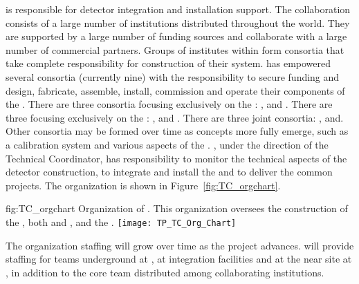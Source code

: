  is responsible for detector integration
and installation support. 
The  collaboration consists of a large number of
institutions distributed throughout the world. They are supported by a
large number of funding sources and collaborate with a large number of
commercial partners. Groups of institutes within  form
consortia that take complete responsibility for construction of their
system.   has empowered several consortia (currently nine)
with the responsibility to secure funding and design, fabricate,
assemble, install, commission and operate their components of the
 . There are three consortia focusing
exclusively on the : ,
\single {} and \single {}. There are three
focusing exclusively on the : 
, \dual {} and \dual {}. There are
three joint consortia: ,  and. Other consortia may
be formed over time as concepts more fully emerge, such as a
 calibration system and various aspects of the .
 , under the direction of the
Technical Coordinator, has responsibility to monitor the
technical aspects of the detector construction, to integrate and
install the  and to deliver the common projects. The
  organization is shown in Figure~\ref{fig:TC_orgchart}.

\begin{dunefigure}{fig:TC_orgchart}
  {Organization of . This organization
 oversees the construction of the , both \single and
 \dual, and the .}
\texttt{[image: TP\_TC\_Org\_Chart]}
\end{dunefigure}


The  organization staffing will grow over time as the project
advances.  will provide staffing for teams underground at \surf, at
integration facilities and at the near site at \fnal, in addition to
the core team distributed among collaborating institutions.


